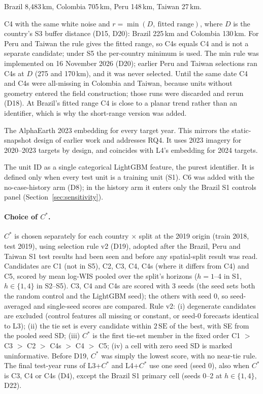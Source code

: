 \documentclass[11pt]{article}
\newcommand{\Cstar}{C^{\ast}}
\begin{document}
\begin{description}
  Brazil 8{,}483\,km, Colombia 705\,km, Peru 148\,km, Taiwan 27\,km.
  \item[C4s: short-range fields.] C4 with the same white noise and $r=\min(D,\ \text{fitted range})$, where
  $D$ is the country's S3 buffer distance (D15, D20): Brazil 225\,km and Colombia 130\,km. For Peru and Taiwan
  the rule gives the fitted range, so C4s equals C4 and is not a separate candidate; under S5 the
  per-country minimum is used. The min rule was implemented on 16 November 2026 (D20); earlier Peru and
  Taiwan selections ran C4s at $D$ (275 and 170\,km), and it was never selected. Until the same date C4
  and C4s were all-missing in Colombia and Taiwan, because units without geometry entered the field
  construction; those runs were discarded and rerun (D18). At Brazil's fitted range C4 is close to a planar trend rather than an
  identifier, which is why the short-range version was added.
  \item[C5: static snapshot.] The AlphaEarth 2023 embedding for every target year. This mirrors the
  static-snapshot design of earlier work and addresses RQ4. It uses 2023 imagery for 2020--2023 targets
  by design, and coincides with L4's embedding for 2024 targets.
  \item[C6: unit identifier.] The unit ID as a single categorical LightGBM feature, the purest
  identifier. It is defined only when every test unit is a training unit (S1). C6 was added with the
  no-case-history arm (D8); in the history arm it enters only the Brazil S1 controls panel
  (Section~\ref{sec:sensitivity}).
\end{description}

\paragraph{Choice of $\Cstar$.}
$\Cstar$ is chosen separately for each country $\times$ split at the 2019 origin (train 2018, test 2019),
using selection rule v2 (D19), adopted after the Brazil, Peru and Taiwan S1 test results had been seen
and before any spatial-split result was read. Candidates are C1 (not in S5), C2, C3, C4, C4s (where it
differs from C4) and C5, scored by mean log-WIS pooled over the split's horizons ($h=1$--4 in S1,
$h\in\{1,4\}$ in S2--S5). C3, C4 and C4s are scored with 3 seeds (the seed sets both the random control
and the LightGBM seed); the others with seed 0, so seed-averaged and single-seed scores are compared.
Rule v2: (i) degenerate candidates are excluded (control features all missing or constant, or seed-0
forecasts identical to L3); (ii) the tie set is every candidate within $2\,\mathrm{SE}$ of the best, with SE
from the pooled seed SD; (iii) $\Cstar$ is the first tie-set member in the fixed order
C1 $>$ C3 $>$ C2 $>$ C4s $>$ C4 $>$ C5; (iv) a cell with zero seed SD is marked uninformative. Before D19,
$\Cstar$ was simply the lowest score, with no near-tie rule.
The final test-year runs of L3+$\Cstar$ and L4+$\Cstar$ use one seed (seed 0), also when $\Cstar$ is
C3, C4 or C4s (D4), except the Brazil S1 primary cell (seeds 0--2 at $h\in\{1,4\}$, D22).
\end{document}

